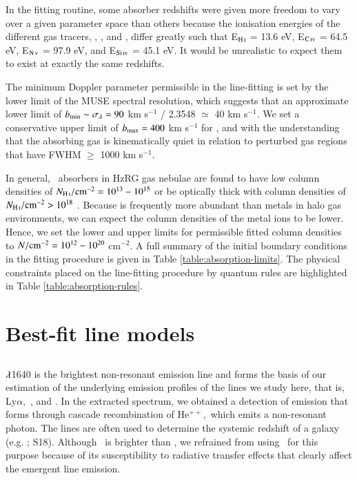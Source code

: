 In the fitting routine, some absorber redshifts were given more freedom to vary over a given parameter space than others because 
the ionisation energies of the different gas tracers, , ,  and , differ greatly such that E$_\ion{H}{I}$ = 13.6 eV, E$_\ion{C}{IV}$ = 64.5 eV, E$_\ion{N}{V}$ = 97.9 eV, and E$_\ion{Si}{IV}$ = 45.1 eV. It would be unrealistic to expect them to exist at exactly the same redshifts. 

The minimum Doppler parameter permissible in the line-fitting is set by the lower limit of the MUSE spectral resolution, which suggests that an approximate lower limit of $b_{\rm min} \sim \sigma_\lambda = 90$ km s$^{-1}$ / 2.3548 $\simeq$ 40 km s$^{-1}.$ We set a conservative upper limit of $b_{\rm max} = 400$ km s$^{-1}$ for ,  and  with the understanding that the absorbing gas is kinematically quiet in relation to perturbed gas regions that have FWHM $\geq$ 1000 km s$^{-1}.$ 

In general, \lya~absorbers in HzRG gas nebulae are found to have low column densities of $N_\ion{H}{I}/{\rm cm}^{-2} = 10^{13} - 10^{15}$ or be optically thick with column densities of $N_\ion{H}{I}/{\rm cm}^{-2} > 10^{18}$  \citep{wilman2004}. Because  is frequently more abundant than metals in halo gas environments, we can expect the column densities of the metal ions to be lower. Hence, we set the lower and upper limits for permissible fitted column densities to $N/{\rm cm}^{-2} = 10^{12} - 10^{20}$ cm$^{-2}.$ A full summary of the initial boundary conditions in the fitting procedure is given in Table \ref{table:absorption-limits}. The physical constraints placed on the line-fitting procedure by quantum rules are highlighted in Table \ref{table:absorption-rules}. 

\section{Best-fit line models}\label{section:best-fit-line}
\subsection{}\label{section:Heii-fit}
 $\lambda$1640 is the brightest non-resonant emission line and forms the basis of our estimation of the underlying emission profiles of the lines we study here, that is, Ly$\alpha,$ ,  and . In the extracted spectrum, we obtained a detection of  emission that forms through cascade recombination of He$^{++},$ which emits a non-resonant photon. The  lines are often used to determine the systemic redshift of a galaxy (e.g. \citealp{reuland2007,swinbank2015}; S18). Although \lya~is brighter than , we refrained from using \lya~for this purpose because of its susceptibility to radiative transfer effects that clearly affect the emergent line emission.

